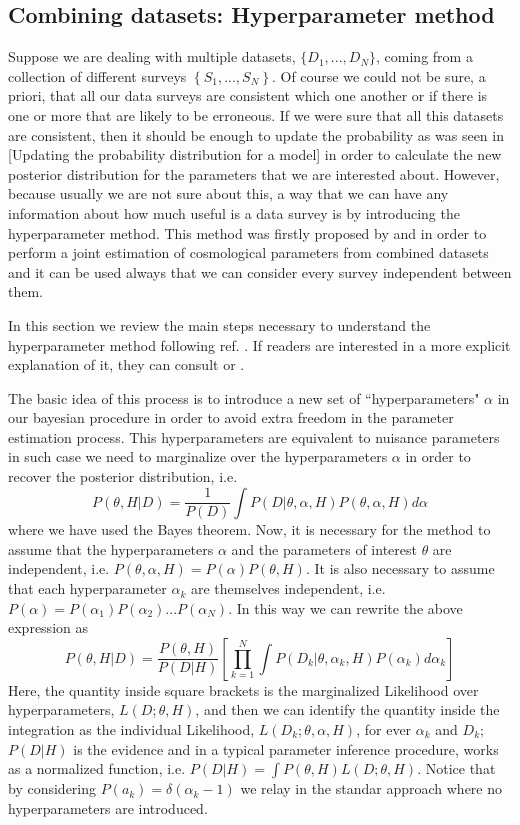 \documentclass[onecolumn,           %
               showpacs,            %
               preprintnumbers,     %
               aps,                 %
               prl,          	    %
               letterpaper,             %
               superscriptaddress,      %
               nofootinbib,         %
               tightenlines,        %
               floats,floatfix      %
               ,usenatbib,
               ]{revtex4-1}
\begin{document}
\subsection{Combining datasets: Hyperparameter method}

Suppose we are dealing with multiple datasets,  $\lbrace D_1,...,D_N\rbrace$, coming from a collection of different surveys $\left\lbrace S_1,...,S_N\right\rbrace$. Of course we could not be sure, a priori, that all our data surveys are consistent which one another or if there is one or more that are likely to be erroneous. If we were sure that all this datasets are consistent, then it should be enough to update the probability as was seen in [Updating the probability distribution for a model] in order to calculate the new posterior distribution for the parameters that we are interested about. However, because usually we are not sure about this, a way that we can have any information about how much useful is a data survey is by introducing the hyperparameter method. This method was firstly proposed by \cite{hiperp} and \cite{hiperp1} in order to perform a joint estimation of cosmological parameters from combined datasets and it can be used always that we can consider every survey independent between them.

In this section we review the main steps necessary to understand the hyperparameter method following ref. \cite{hiperp1}. If readers are interested in a more explicit explanation of it, they can consult \cite{hiperp} or \cite{hiperp1}.

The basic idea of this process is to introduce a new set of ``hyperparameters" $\alpha$ in our bayesian procedure in order to avoid extra freedom in the parameter estimation process.  This hyperparameters are equivalent to nuisance parameters in such case we need to marginalize over the hyperparameters $\alpha$ in order to recover the posterior distribution, i.e.
\begin{equation}
P(\theta,H|D)=\frac{1}{P(D)}\int P(D|\theta,\alpha,H)P(\theta,\alpha,H)d\alpha
\end{equation}
where we have used the Bayes theorem. Now, it is necessary for the method to assume that the hyperparameters $\alpha$ and the parameters of interest $\theta$ are independent, i.e. $P(\theta,\alpha,H)=P(\alpha)P(\theta,H)$. It is also necessary to assume that each hyperparameter $\alpha_k$ are themselves independent, i.e. $P(\alpha)=P(\alpha_1)P(\alpha_2)...P(\alpha_N)$. In this way we can rewrite the above expression as
\begin{equation}
P(\theta,H|D)=\frac{P(\theta,H)}{P(D|H)}\left[\prod_{k=1}^N\int P(D_k|\theta,\alpha_k,H)P(\alpha_k)d\alpha_k\right]
\end{equation}
Here, the quantity inside square brackets is the marginalized Likelihood over hyperparameters, $L(D;\theta,H)$, and then we can identify the quantity inside the integration as the individual Likelihood, $L(D_k;\theta,\alpha,H)$, for ever $\alpha_k$ and $D_k$; $P(D|H)$ is the evidence and in a typical parameter inference procedure, works as a normalized function, i.e. $P(D|H)=\int P(\theta,H)L(D;\theta,H)$. Notice that by considering $P(a_k)=\delta(\alpha_k-1)$ we relay in the standar approach where no hyperparameters are introduced.  
\end{document}
